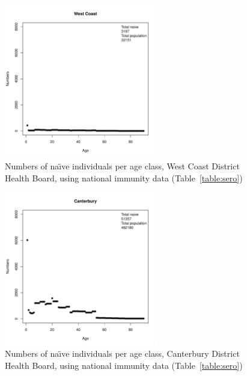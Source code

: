 \documentclass{article}
\begin{document}
\begin{itemize}
\begin{figure}[H]
     \begin{center}
     \includegraphics[width=0.6\textwidth]{dhb17.pdf}
     \end{center}
     \caption{Numbers of na\"{\i}ve individuals per age class, West Coast District Health Board, using national immunity data (Table~\ref{table:sero})}
     \label{fig:WestCoast}
\end{figure}

\begin{figure}[H]
   \begin{center}
     \includegraphics[width=0.6\textwidth]{dhb18.pdf}
     \end{center}
     \caption{Numbers of na\"{\i}ve individuals per age class, Canterbury District Health Board, using national immunity data (Table~\ref{table:sero})}
     \label{fig:Canterbury}
\end{figure}


\end{itemize}
\end{document}
